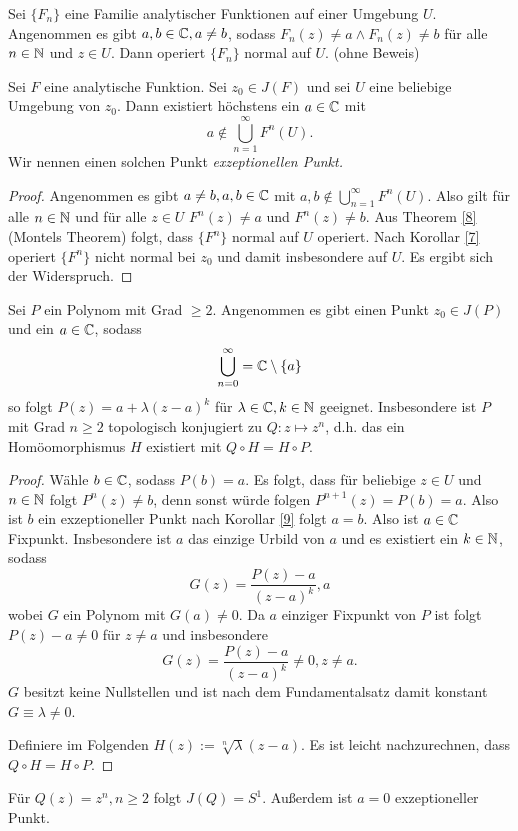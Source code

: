 \documentclass{mywork}
\begin{document}
\begin{thm} \label{8}
Sei $\{F_n\}$ eine Familie analytischer Funktionen auf einer Umgebung $U$. Angenommen es gibt $a,b \in \mathbb{C}, a\neq b$, sodass $F_n(z)\neq a \land F_n(z)\neq b$ für alle $n\in \mathbb{N}$ und $z\in U$. Dann operiert $\{F_n\}$ normal auf $U$. (ohne Beweis) 
\end{thm}

\begin{kor} \label{9}
Sei $F$ eine analytische Funktion. Sei $z_0\in J(F)$ und sei $U$ eine beliebige Umgebung von $z_0$. Dann existiert höchstens ein $a\in \mathbb{C}$ mit
\[
	a\not\in \bigcup_{n=1}^\infty F^n(U).
\]
Wir nennen einen solchen Punkt \emph{exzeptionellen Punkt.}
\end{kor}

\begin{proof}
Angenommen es gibt $a\neq b, a,b \in \mathbb{C}$ mit $a,b \not\in \bigcup_{n=1}^\infty F^n(U)$. Also gilt für alle $n\in \mathbb{N}$ und für alle $z\in U$ $F^n(z)\neq a$ und $F^n(z)\neq b$. Aus Theorem \ref{8} (Montels Theorem) folgt, dass $\{F^n\}$ normal auf $U$ operiert. Nach Korollar \ref{7} operiert $\{F^n\}$ nicht normal bei $z_0$ und damit insbesondere auf $U$. Es ergibt sich der Widerspruch.
\end{proof}

\begin{thm}\label{10}
Sei $P$ ein Polynom mit Grad $\ge 2$. Angenommen es gibt einen Punkt $z_0\in J(P)$ und ein $a\in \mathbb{C}$, sodass 
\[
\bigcup_{n=0}^\infty=\mathbb{C}\setminus\{a\}
\]
so folgt $P(z)=a+\lambda(z-a)^k$ für $\lambda \in \mathbb{C}, k\in \mathbb{N}$ geeignet. 
Insbesondere ist $P$ mit Grad $n\ge 2$ topologisch konjugiert zu $Q: z \mapsto z^n$, d.h. 
das ein Homöomorphismus $H$ existiert mit $Q\circ H=H\circ P$.
\end{thm}

\begin{proof}
Wähle $b\in \mathbb{C}$, sodass $P(b)=a$. Es folgt, dass für beliebige $z\in U$ und $n\in \mathbb{N}$ folgt $P^n(z)\neq b$, denn sonst würde folgen $P^{n+1}(z)=P(b)=a$. Also ist $b$ ein exzeptioneller Punkt nach Korollar \ref{9} folgt $a=b$. Also ist $a\in \mathbb{C}$ Fixpunkt. Insbesondere ist $a$ das einzige Urbild von $a$ und es existiert ein $k\in \mathbb{N}$, sodass
\[
G(z)=\frac{P(z)-a}{(z-a)^k},a
\] 
wobei $G$ ein Polynom mit $G(a)\neq 0$. Da $a$ einziger Fixpunkt von $P$ ist folgt $P(z)-a\neq 0$ für $z\neq a$ und insbesondere 
\[
G(z)=\frac{P(z)-a}{(z-a)^k}\neq 0, z \neq a.
\]
$G$ besitzt keine Nullstellen und ist nach dem Fundamentalsatz damit konstant $G\equiv \lambda\neq 0$.

Definiere im Folgenden $H(z):=\sqrt[n]{\lambda}(z-a)$. Es ist leicht nachzurechnen, dass $Q\circ H=H\circ P$.
\end{proof}
\begin{nt} \label{11}
Für $Q(z)=z^n, n\ge 2$ folgt $J(Q)=S^1$. Außerdem ist $a=0$ exzeptioneller Punkt. 
\end{nt}
\end{document}
